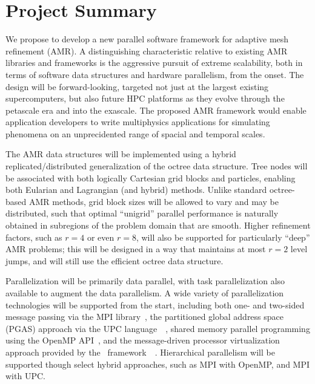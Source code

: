 \documentclass[10pt,twocolumn]{article}
\begin{document}
\section{Project Summary}  \label{s:summary}

%
We propose to develop a new parallel software framework for adaptive
mesh refinement (AMR).  
%
A distinguishing characteristic relative to existing AMR libraries and
frameworks is the aggressive pursuit of extreme scalability, both in terms
of software data structures and hardware parallelism, from the
onset.
%
The design will be forward-looking, targeted not just at the largest
existing supercomputers, but also future HPC platforms as they evolve
through the petascale era and into the exascale.
%
The proposed AMR framework would enable application developers to
write multiphysics applications for simulating phenomena on an
unprecidented range of spacial and temporal scales.

%
The AMR data structures will be implemented using a hybrid
replicated/distributed generalization of the octree data structure.
Tree nodes will be associated with both logically Cartesian grid
blocks and particles, enabling both Eularian and Lagrangian (and
hybrid) methods.  Unlike standard octree-based AMR methods, grid block
sizes will be allowed to vary and may be distributed, such that
optimal ``unigrid'' parallel performance is naturally obtained in
subregions of the problem domain that are smooth.  Higher refinement
factors, such as $r=4$ or even $r=8$, will also be supported for
particularly ``deep'' AMR problems; this will be designed in a way
that maintains at most $r=2$ level jumps, and will still use the
efficient octree data structure.

%
Parallelization will be primarily data parallel, with task
parallelization also available to augment the data parallelism.
%
A wide variety of parallelization technologies will be supported from
the start, including both one- and two-sided message passing via the
MPI library~\cite{wwwmpi}, the partitioned global address space (PGAS)
approach via the UPC language~\cite{wwwupc}~\cite{upc}, shared memory
parallel programming using the OpenMP API~\cite{wwwopenmp}, and the
message-driven processor virtualization approach provided by the
\charm\ framework~\cite{KaBo07}~\cite{wwwcharm}.
%
Hierarchical parallelism will be supported though select hybrid
approaches, such as MPI with OpenMP, and MPI with UPC.
\end{document}
